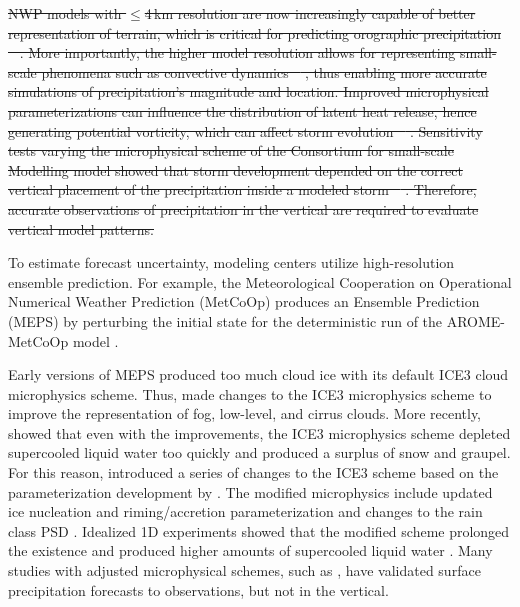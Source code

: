 \documentclass{ametsocV5}
\providecommand{\DIFdel}[1]{{\protect\color{red}\sout{#1}}}                      %
\providecommand{\DIFdelbegin}{} %
\providecommand{\DIFdelend}{} %
\newcommand{\DIFscaledelfig}{0.5}
\newlength{\DIFdelgraphicswidth} %
\newlength{\DIFdelgraphicsheight} %
\newcommand{\DIFdelincludegraphics}[2][]{%
\sbox{\DIFdelgraphicsbox}{\DIFOincludegraphics[#1]{#2}}%
\settoboxwidth{\DIFdelgraphicswidth}{\DIFdelgraphicsbox} %
\settoboxtotalheight{\DIFdelgraphicsheight}{\DIFdelgraphicsbox} %
\scalebox{\DIFscaledelfig}{%
\parbox[b]{\DIFdelgraphicswidth}{\usebox{\DIFdelgraphicsbox}\\[-\baselineskip] \rule{\DIFdelgraphicswidth}{0em}}\llap{\resizebox{\DIFdelgraphicswidth}{\DIFdelgraphicsheight}{%
\setlength{\unitlength}{\DIFdelgraphicswidth}%
\begin{picture}(1,1)%
\thicklines\linethickness{2pt} %
{\color[rgb]{1,0,0}\put(0,0){\framebox(1,1){}}}%
{\color[rgb]{1,0,0}\put(0,0){\line( 1,1){1}}}%
{\color[rgb]{1,0,0}\put(0,1){\line(1,-1){1}}}%
\end{picture}%
}\hspace*{3pt}}} %
} %
\DeclareRobustCommand{\DIFdelbegin}{\DIFOdelbegin \let\includegraphics\DIFdelincludegraphics} %
\DeclareRobustCommand{\DIFdelend}{\DIFOaddend \let\includegraphics\DIFOincludegraphics} %
\begin{document}
    \DIFdelbegin \DIFdel{NWP models with $\leq$4\,km resolution are now increasingly capable of better representation of terrain, which is critical for predicting orographic precipitation \mbox{%
\citep{colle_59_2000, colle_1314_2005, garvert_1314_2005, schwartz_reproducing_2014}}\hspace{0pt}%
. More importantly, the higher model resolution allows for representing small-scale phenomena such as convective dynamics \mbox{%
\citep{gowan_validation_2018}}\hspace{0pt}%
, thus enabling more accurate simulations of precipitation's magnitude and location. Improved microphysical parameterizations can influence the distribution of latent heat release, hence generating potential vorticity, which can affect storm evolution \mbox{%
\citep{joos_influence_2012}}\hspace{0pt}%
. Sensitivity tests varying the microphysical scheme of the Consortium for small-scale Modelling model showed that storm development depended on the correct vertical placement of the precipitation inside a modeled storm \mbox{%
\citep{joos_influence_2012}}\hspace{0pt}%
. Therefore, accurate observations of precipitation in the vertical are required to evaluate vertical model patterns. 
    }%

\DIFdelend %
    To estimate forecast uncertainty, modeling centers utilize high-resolution ensemble prediction. For example, the Meteorological Cooperation on Operational Numerical Weather Prediction (MetCoOp) produces an Ensemble Prediction (MEPS) by perturbing the initial state for the deterministic run of the  AROME-MetCoOp model \citep[AROME-Applications of Research to Operations at Mesoscale;][]{frogner_convection-permitting_2019}. 

    Early versions of MEPS produced too much cloud ice with its default ICE3 cloud microphysics scheme. Thus, \citet{muller_arome-metcoop:_2017} made changes to the ICE3 microphysics scheme to improve the representation of fog, low-level, and cirrus clouds. More recently, \citet{engdahl_improving_2020} showed that even with the improvements, the ICE3 microphysics scheme depleted supercooled liquid water too quickly and produced a surplus of snow and graupel. For this reason, \citet{engdahl_improving_2020} introduced a series of changes to the ICE3 scheme based on the parameterization development by \citet{thompson_explicit_2004,thompson_explicit_2008}. The modified microphysics include updated ice nucleation and riming/accretion parameterization and changes to the rain class PSD \citep{engdahl_improving_2020}. Idealized 1D experiments showed that the modified scheme prolonged the existence and produced higher amounts of supercooled liquid water \citep{engdahl_improving_2020}. 
	Many studies with adjusted microphysical schemes, such as \cite{liu_high-resolution_2011}, have validated surface precipitation forecasts to observations, but not in the vertical.
\end{document}
